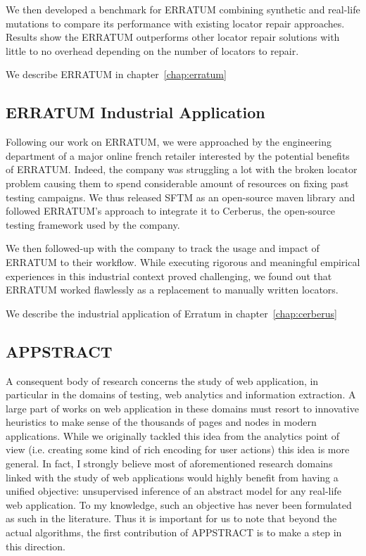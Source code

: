 We then developed a benchmark for ERRATUM combining synthetic and real-life mutations to compare its performance with existing locator repair approaches. Results show the ERRATUM outperforms other locator repair solutions with little to no overhead depending on the number of locators to repair.

We describe ERRATUM in chapter~\ref{chap:erratum}

\subsection{ERRATUM Industrial Application}
Following our work on ERRATUM, we were approached by the engineering department of a major online french retailer interested by the potential benefits of ERRATUM. Indeed, the company was struggling a lot with the broken locator problem causing them to spend considerable amount of resources on fixing past testing campaigns.
We thus released SFTM as an open-source maven library and followed ERRATUM's approach to integrate it to Cerberus, the open-source testing framework used by the company.

We then followed-up with the company to track the usage and impact of ERRATUM to their workflow. 
While executing rigorous and meaningful empirical experiences in this industrial context proved challenging, we found out that ERRATUM worked flawlessly as a replacement to manually written locators.

We describe the industrial application of Erratum in chapter~\ref{chap:cerberus}

\subsection{APPSTRACT}
A consequent body of research concerns the study of web application, in particular in the domains of testing, web analytics and information extraction. A large part of works on web application in these domains must resort to innovative heuristics to make sense of the thousands of pages and nodes in modern applications.
While we originally tackled this idea from the analytics point of view (i.e. creating some kind of rich encoding for user actions) this idea is more general.
In fact, I strongly believe most of aforementioned research domains linked with the study of web applications would highly benefit from having a unified objective: unsupervised inference of an abstract model for any real-life web application. 
To my knowledge, such an objective has never been formulated as such in the literature.
Thus it is important for us to note that beyond the actual algorithms, the first contribution of APPSTRACT is to make a step in this direction.

